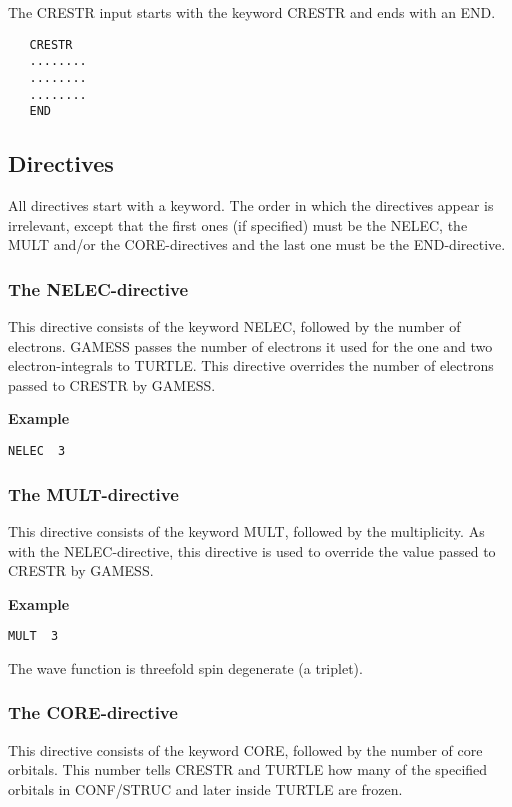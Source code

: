 \documentclass[11pt,fleqn]{article}
\begin{document}
The CRESTR input starts with the keyword CRESTR and ends with an END.

\begin{verbatim}
   CRESTR
   ........
   ........
   ........
   END
\end{verbatim}

\subsection{Directives}

All directives start with a keyword. The order in which the directives 
appear is irrelevant, except that the first ones (if specified)  
must be the NELEC, the MULT and/or the CORE-directives and the last
one must be the END-directive.

\subsubsection{The NELEC-directive}

This directive consists of the keyword NELEC, followed by 
the number of electrons.  GAMESS passes the number of electrons it used
for the one and two electron-integrals to TURTLE. This directive overrides the
number of electrons passed to CRESTR by GAMESS.

{\bf Example }
\begin{verbatim}
NELEC  3
\end{verbatim}

\subsubsection{The MULT-directive}

This directive consists of the keyword MULT, followed by the multiplicity. 
As with the NELEC-directive, this directive is used to override the value passed
 to CRESTR by GAMESS.

{\bf Example }
\begin{verbatim}
MULT  3
\end{verbatim}

The wave function is threefold spin degenerate (a triplet).

\subsubsection{The CORE-directive}

This directive consists of the keyword CORE, followed by the number of core orbitals.
This number tells CRESTR and TURTLE how many of the specified orbitals in
CONF/STRUC and later inside TURTLE are frozen.
\end{document}
